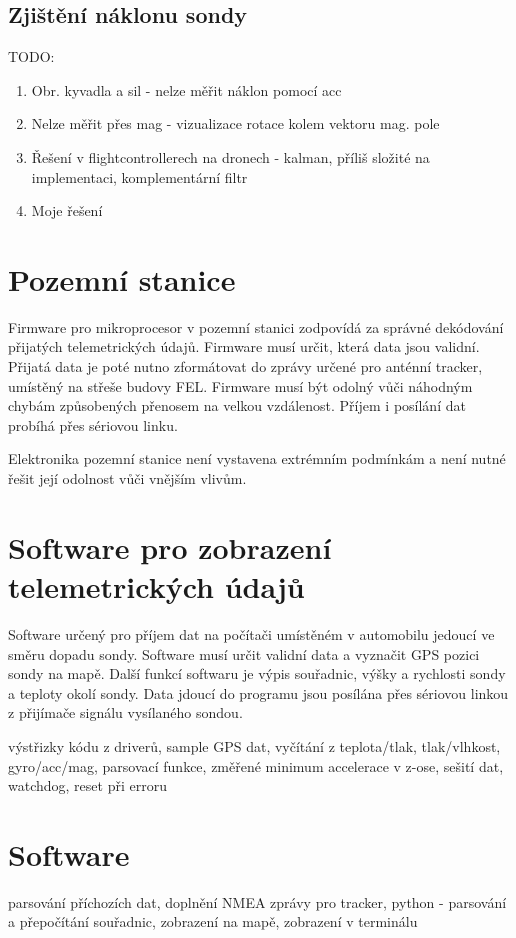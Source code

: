 \documentclass[twoside]{ctuthesis}
\theoremstyle{plain}
\theoremstyle{definition}
\theoremstyle{note}
\begin{document}
	\subsection{Zjištění náklonu sondy}
	TODO:
	\begin{enumerate}
		\item Obr. kyvadla a sil - nelze měřit náklon pomocí acc
  		\item Nelze měřit přes mag - vizualizace rotace kolem vektoru mag. pole
    	\item Řešení v flightcontrollerech na dronech - kalman, příliš složité na implementaci, komplementární filtr
     	\item Moje řešení
	\end{enumerate}
	


\section{Pozemní stanice}
Firmware pro mikroprocesor v pozemní stanici zodpovídá za správné dekódování přijatých telemetrických údajů. Firmware musí určit, která data jsou validní. Přijatá data je poté nutno zformátovat do zprávy určené pro anténní tracker, umístěný na střeše budovy FEL. Firmware musí být odolný vůči náhodným chybám způsobených přenosem na velkou vzdálenost. Příjem i posílání dat probíhá přes sériovou linku. 

Elektronika pozemní stanice není vystavena extrémním podmínkám a není nutné řešit její odolnost vůči vnějším vlivům. 

\section{Software pro zobrazení telemetrických údajů}
Software určený pro příjem dat na počítači umístěném v automobilu jedoucí ve směru dopadu sondy. Software musí určit validní data a vyznačit GPS pozici sondy na mapě. Další funkcí softwaru je výpis souřadnic, výšky a rychlosti sondy a teploty okolí sondy. Data jdoucí do programu jsou posílána přes sériovou linkou z přijímače signálu vysílaného sondou. 

	výstřizky kódu z driverů, sample GPS dat, vyčítání z teplota/tlak, tlak/vlhkost, gyro/acc/mag, parsovací funkce, změřené minimum accelerace v z-ose, sešití dat, watchdog, reset při erroru

	\section{Software}
	parsování příchozích dat, doplnění NMEA zprávy pro tracker, python - parsování a přepočítání souřadnic, zobrazení na mapě, zobrazení v terminálu
\end{document}

